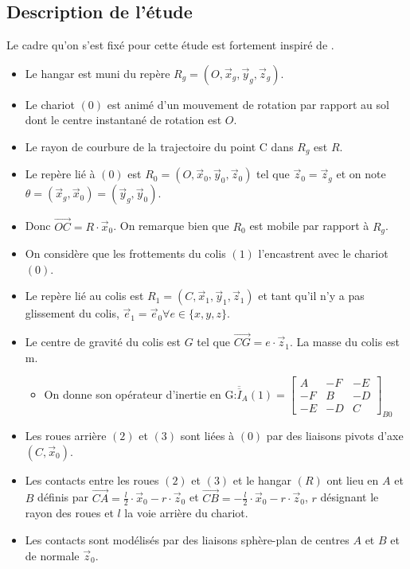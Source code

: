\subsection{Description de l'étude}
Le cadre qu'on s'est fixé pour cette étude est fortement inspiré de \cite{arnaud}.
\begin{itemize}
	\item Le hangar est muni du repère $R_g = (O,\vec x_g, \vec y_g, \vec z_g)$.
	\item Le chariot $(0)$ est animé d'un mouvement de rotation par rapport au sol dont le centre instantané de rotation est $O$.
	\item Le rayon de courbure de la trajectoire du point C dans $R_g$ est $R$.
	\item Le repère lié à $(0)$ est $R_0 = (O, \vec x_0, \vec y_0, \vec z_0)$ tel que $\vec z_0 = \vec z_g$ et on note $\theta = (\vec x_g, \vec x_0) = (\vec y_g, \vec y_0)$.
	\item Donc $\vec{OC} = R \cdot \vec x_0$. On remarque bien que $R_0$ est mobile par rapport à $R_g$.
	\item On considère que les frottements du colis $(1)$ l'encastrent avec le chariot $(0)$.
	\item Le repère lié au colis est $R_1 = (C, \vec x_1, \vec y_1, \vec z_1)$ et tant qu'il n'y a pas glissement du colis, $\vec e_1 = \vec e_0 \forall e \in \{x,y,z\}$.
	\item Le centre de gravité du colis est $G$ tel que $\vec{CG} = e\cdot\vec z_1$. La masse du colis est m.
		\begin{itemize}
			\item On donne son opérateur d'inertie en G:$\overline{\overline{I}}_A(1) = \left[ \begin{array}{ccc}
					A & -F & -E \\
					-F & B & -D \\
					-E & -D & C
			\end{array} \right]_{B0}$
		\end{itemize}
	\item Les roues arrière $(2)$ et $(3)$ sont liées à $(0)$ par des liaisons pivots d'axe $(C, \vec x_0)$.
	\item Les contacts entre les roues $(2)$ et $(3)$ et le hangar $(R)$ ont lieu en $A$ et $B$ définis par $\vec{CA} = \frac{l}{2} \cdot \vec x_0 - r\cdot \vec z_0$ et $\vec{CB} = -\frac{l}{2} \cdot \vec x_0 - r\cdot \vec z_0$, $r$ désignant le rayon des roues et $l$ la voie arrière du chariot.
	\item Les contacts sont modélisés par des liaisons sphère-plan de centres $A$ et $B$ et de normale $\vec z_0$.

\end{itemize}
